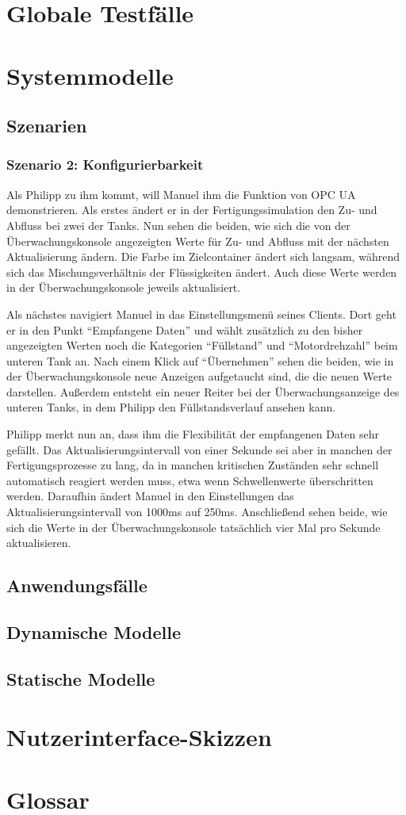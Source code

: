 \documentclass[parskip=full]{scrartcl}
\begin{document}
\section{Globale Testfälle}
\Blindtext[1]

\section{Systemmodelle}
\subsection{Szenarien}
\subsubsection{Szenario 2: Konfigurierbarkeit}
Als Philipp zu ihm kommt, will Manuel ihm die Funktion von OPC UA demonstrieren.
Als erstes ändert er in der Fertigungssimulation den Zu- und Abfluss bei zwei der Tanks. Nun sehen die beiden, wie
sich die von der Überwachungskonsole angezeigten Werte für Zu- und Abfluss mit der nächsten Aktualisierung ändern. Die
Farbe im Zielcontainer ändert sich langsam, während sich das Mischungsverhältnis der Flüssigkeiten ändert. Auch diese
Werte werden in der Überwachungskonsole jeweils aktualisiert.

Als nächstes navigiert Manuel in das Einstellungsmenü seines Clients. Dort geht er in den Punkt ``Empfangene Daten'' und
wählt zusätzlich zu den bisher angezeigten Werten noch die Kategorien ``Füllstand'' und ``Motordrehzahl'' beim unteren Tank
an. Nach einem Klick auf ``Übernehmen'' sehen die beiden, wie in der Überwachungskonsole neue Anzeigen aufgetaucht sind,
die die neuen Werte darstellen. Außerdem entsteht ein neuer Reiter bei der Überwachungsanzeige des unteren Tanks,
in dem Philipp den Füllstandsverlauf ansehen kann.

Philipp merkt nun an, dass ihm die Flexibilität der empfangenen Daten sehr gefällt. Das Aktualisierungsintervall von
einer Sekunde sei aber in manchen der Fertigungsprozesse zu lang, da in manchen kritischen Zuständen sehr schnell
automatisch reagiert werden muss, etwa wenn Schwellenwerte überschritten werden. Daraufhin ändert Manuel in den
Einstellungen das Aktualisierungsintervall von 1000ms auf 250ms. Anschließend sehen beide, wie sich die Werte in der
Überwachungskonsole tatsächlich vier Mal pro Sekunde aktualisieren.

\subsection{Anwendungsfälle}
\Blindtext[1]

\subsection{Dynamische Modelle}
\Blindtext[1]

\subsection{Statische Modelle}
\Blindtext[1]

\section{Nutzerinterface-Skizzen}
\Blindtext[1]

\section{Glossar}
\Blindtext[1]
\end{document}
